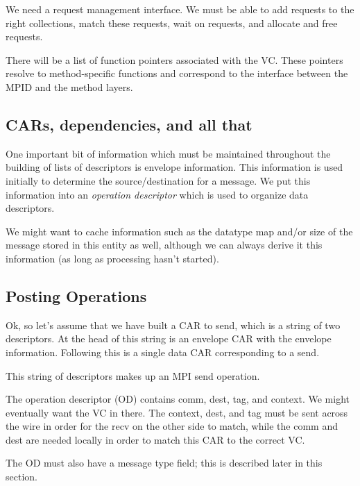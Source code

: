 \documentclass[11pt,letterpaper]{article}
\begin{document}
We need a request management interface.  We must be able to add requests to the
right collections, match these requests, wait on requests, and allocate and
free requests.

There will be a list of function pointers associated with the VC.  These
pointers resolve to method-specific functions and correspond to the interface
between the MPID and the method layers.

\subsection{CARs, dependencies, and all that}

One important bit of information which must be maintained throughout the
building of lists of descriptors is envelope information.  This information is
used initially to determine the source/destination for a message.  We put this
information into an \emph{operation descriptor} which is used to organize data
descriptors.

We might want to cache information such as the datatype map and/or size of the
message stored in this entity as well, although we can always derive it this
information (as long as processing hasn't started).

\subsection{Posting Operations}


Ok, so let's assume that we have built a CAR to send, which is a string of two
descriptors.  At the head of this string is an envelope CAR with the envelope
information.  Following this is a single data CAR corresponding to a send.

This string of descriptors makes up an MPI send operation.

The operation descriptor (OD) contains comm, dest, tag, and context.  We might
eventually want the VC in there.  The context, dest, and tag must be sent
across the wire in order for the recv on the other side to match, while the
comm and dest are needed locally in order to match this CAR to the correct
VC.

The OD must also have a message type field; this is described later in this
section.

\end{document}
